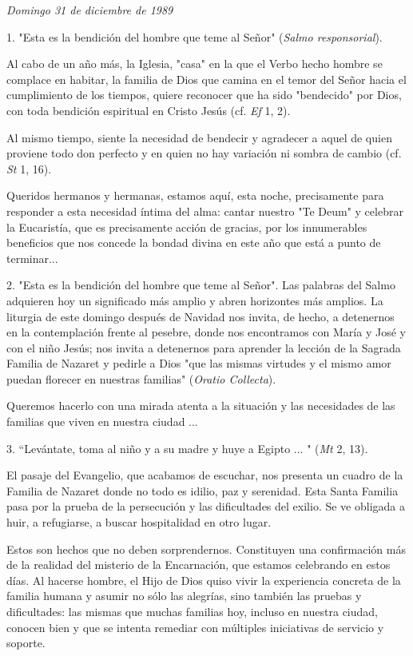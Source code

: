 \begin{body}
\emph{Domingo 31 de diciembre de 1989}

\begin{body} 
1. "Esta es la bendición del hombre que teme al Señor" (\emph{Salmo responsorial}).

Al cabo de un año más, la Iglesia, "casa" en la que el Verbo hecho hombre se complace en habitar, la familia de Dios que camina en el temor del Señor hacia el cumplimiento de los tiempos, quiere reconocer que ha sido "bendecido" por Dios, con toda bendición espiritual en Cristo Jesús (cf. \emph{Ef} 1, 2).

Al mismo tiempo, siente la necesidad de bendecir y agradecer a aquel de quien proviene todo don perfecto y en quien no hay variación ni sombra de cambio (cf. \emph{St} 1, 16).

Queridos hermanos y hermanas, estamos aquí, esta noche, precisamente para responder a esta necesidad íntima del alma: cantar nuestro "Te Deum" y celebrar la Eucaristía, que es precisamente acción de gracias, por los innumerables beneficios que nos concede la bondad divina en este año que está a punto de terminar...

2. "Esta es la bendición del hombre que teme al Señor". Las palabras del Salmo adquieren hoy un significado más amplio y abren horizontes más amplios. La liturgia de este domingo después de Navidad nos invita, de hecho, a detenernos en la contemplación frente al pesebre, donde nos encontramos con María y José y con el niño Jesús; nos invita a detenernos para aprender la lección de la Sagrada Familia de Nazaret y pedirle a Dios "que las mismas virtudes y el mismo amor puedan florecer en nuestras familias" (\emph{Oratio Collecta}).

Queremos hacerlo con una mirada atenta a la situación y las necesidades de las familias que viven en nuestra ciudad ...

3. ``Levántate, toma al niño y a su madre y huye a Egipto ... " (\emph{Mt} 2, 13).

El pasaje del Evangelio, que acabamos de escuchar, nos presenta un cuadro de la Familia de Nazaret donde no todo es idilio, paz y serenidad. Esta Santa Familia pasa por la prueba de la persecución y las dificultades del exilio. Se ve obligada a huir, a refugiarse, a buscar hospitalidad en otro lugar.

Estos son hechos que no deben sorprendernos. Constituyen una confirmación más de la realidad del misterio de la Encarnación, que estamos celebrando en estos días. Al hacerse hombre, el Hijo de Dios quiso vivir la experiencia concreta de la familia humana y asumir no sólo las alegrías, sino también las pruebas y dificultades: las mismas que muchas familias hoy, incluso en nuestra ciudad, conocen bien y que se intenta remediar con múltiples iniciativas de servicio y soporte.


\end{body}
\end{body}
